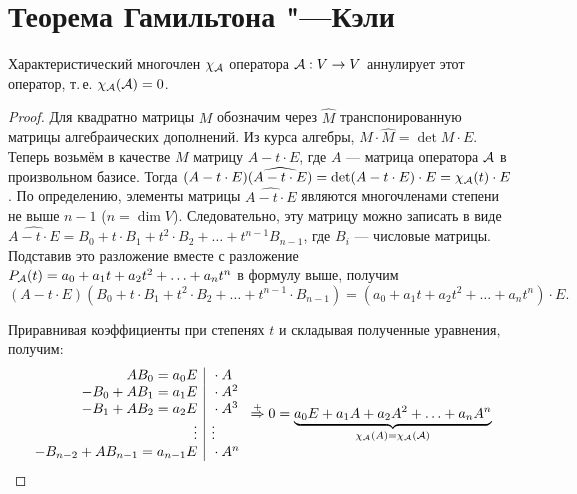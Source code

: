 \section{Теорема Гамильтона "---Кэли}

\begin{theorem}
    Характеристический многочлен $\chi_{\mathcal{A}}$ оператора $\mathcal{A}: V \to V$ аннулирует этот оператор, т.\,е. $\chi_{\mathcal{A}}(\mathcal{A}) = 0$.
\end{theorem}

\begin{proof}
    Для квадратно матрицы $M$ обозначим через $\widehat{M}$ транспонированную матрицы алгебраических дополнений. Из курса алгебры, $M \cdot \widehat{M} = \det M \cdot E$. Теперь возьмём в качестве $M$ матрицу $A - t \cdot E$, где $A$ --- матрица оператора $\mathcal{A}$ в произвольном базисе. Тогда $(A - t \cdot E)(\widehat{A - t \cdot E}) = \det (A - t \cdot E) \cdot E = \chi_{\mathcal{A}}(t) \cdot E$. По определению, элементы матрицы $\widehat{A - t \cdot E}$ являются многочленами степени не выше $n - 1$ ($n = \dim V$). Следовательно, эту матрицу можно записать в виде $\widehat{A - t \cdot E} = B_0 + t \cdot B_1 + t^2 \cdot B_2 + \ldots + t^{n - 1}B_{n - 1}$, где $B_i$ --- числовые матрицы. Подставив это разложение вместе с разложение $P_{\mathcal{A}}(t) = a_0 + a_1t + a_2t^2 + \ldots + a_nt^n$ в формулу выше, получим
\[
    (A - t \cdot E)(B_0 + t \cdot B_1 + t^2 \cdot B_2 + \ldots + t^{n - 1} \cdot B_{n - 1}) = (a_0 + a_1t + a_2t^2 + \ldots + a_nt^n) \cdot E.
\]

Приравнивая коэффициенты при степенях $t$ и складывая полученные уравнения, получим:
\[
    \begin{array}{r | l}
        AB_0 = a_0E & {} \cdot A\\
        -B_0 + AB_1 = a_1E & {} \cdot A^2\\
        -B_1 + AB_2 = a_2E & {} \cdot A^3\\
        \vdots & \vdots\\
        -B_{n - 2} + AB_{n - 1} = a_{n - 1}E & {} \cdot A^n\\
    \end{array} \overset{+}{\Rightarrow} 0 = \underbrace{a_0E + a_1A + a_2A^2 + \ldots + a_nA^n}_{\chi_{\mathcal{A}}(A) = \chi_{\mathcal{A}}(\mathcal{A})}
\]
\end{proof}

